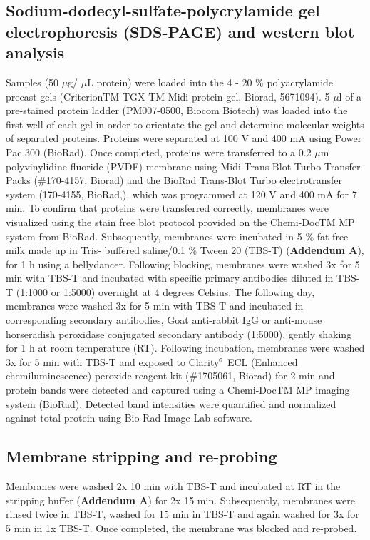 \subsection{Sodium-dodecyl-sulfate-polycrylamide gel electrophoresis (SDS-PAGE) and western blot analysis}\label{sec:SDS_PAGE}
Samples (50 $\mu$g/ $\mu$L protein) were loaded into the 4 - 20 \% polyacrylamide precast gels (CriterionTM TGX TM Midi protein gel, Biorad, 5671094). 5 $\mu$l of a pre-stained protein ladder (PM007-0500, Biocom Biotech) was loaded into the first well of each gel in order to orientate the gel and determine molecular weights of separated proteins. Proteins were separated at 100 V and 400 mA using Power Pac 300 (BioRad). Once completed, proteins were transferred to a 0.2 $\mu$m polyvinylidine fluoride (PVDF) membrane using Midi Trans-Blot Turbo Transfer Packs (\#170-4157, Biorad) and the BioRad Trans-Blot Turbo electrotransfer system (170-4155, BioRad,), which was programmed at 120 V and 400 mA for 7 min. To confirm that proteins were transferred correctly, membranes were visualized using the stain free blot protocol provided on the Chemi-DocTM MP system from BioRad. Subsequently, membranes were incubated in 5 \% fat-free milk made up in Tris- buffered saline/0.1 \% Tween 20 (TBS-T) (\textbf{Addendum A}), for 1 h using a bellydancer. Following blocking, membranes were washed 3x for 5 min with TBS-T and incubated with specific primary antibodies diluted in TBS-T (1:1000 or 1:5000) overnight at 4 degrees Celsius. The following day, membranes were washed 3x for 5 min with TBS-T and incubated in corresponding secondary antibodies, Goat anti-rabbit IgG or anti-mouse horseradish peroxidase conjugated secondary antibody (1:5000), gently shaking for 1 h at room temperature (RT). Following incubation, membranes were washed 3x for 5 min with TBS-T and exposed to Clarity${\textsuperscript{\tiny{\textregistered}}}$ ECL (Enhanced chemiluminescence) peroxide reagent kit (\#1705061, Biorad) for 2 min and protein bands were detected and captured using a Chemi-DocTM MP imaging system (BioRad). Detected band intensities were quantified and normalized against total protein using Bio-Rad Image Lab software.

\subsection{Membrane stripping and re-probing}
Membranes were washed 2x 10 min with TBS-T and incubated at RT in the stripping buffer (\textbf{Addendum A}) for 2x 15 min. Subsequently, membranes were rinsed twice in TBS-T, washed for 15 min in TBS-T and again washed for 3x for 5 min in 1x TBS-T. Once completed, the membrane was blocked and re-probed.

